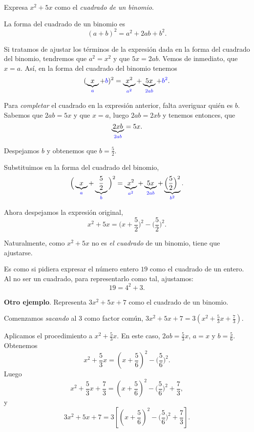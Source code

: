 \documentclass[12pt,letterpaper]{article}
\author{\textsc{Manuel López Mateos}}
\makeatletter
\let\elautor\@author
\newcommand{\nin}{\noindent}
\makeatother
\begin{document}
%
\bigskip 
\nin {\sffamily\scshape\color{orange}Completar Cuadrado}

\nin Expresa $x^2+5x$ como el \emph{cuadrado de un binomio}.

La forma del cuadrado de un binomio es
$$(a+b)^2=a^2+2ab+b^2.$$

Si tratamos de ajustar los términos de la expresión dada en la forma del cuadrado del binomio, tendremos que $a^2=x^2$ y que $5x=2ab$. Vemos de inmediato, que $x=a$. Así, en la forma del cuadrado del binomio tenemos
$$(\underbrace{x}_{\color{blue}a}+{\color{blue}b})^2=\underbrace{x^2}_{\color{blue}a^2}+\underbrace{5x}_{\color{blue}2ab}+{\color{blue}b^2}.$$

Para \emph{completar} el cuadrado en la expresión anterior, falta averiguar quién es $b$. Sabemos que $2ab = 5x$ y que $x=a$, luego $2ab=2xb$ y tenemos entonces, que
$$\underbrace{2xb}_{\color{blue}2ab}=5x.$$

Despejamos $b$ y obtenemos que $b=\frac{5}{2}$.
\smallskip

Substituimos en la forma del cuadrado del binomio,
$$\Big(\underbrace{x}_{\color{blue}a}+\underbrace{\dfrac{5}{2}}_{\color{blue}b}\Big)^2=\underbrace{x^2}_{\color{blue}a^2}+\underbrace{5x}_{\color{blue}2ab}+\underbrace{\Big(\frac{5}{2}\Big)^2}_{\color{blue}b^2}.$$

Ahora despejamos la expresión original,
$$x^2+5x=\Big({x}+\frac{5}{2}\Big)^2-\Big(\frac{5}{2}\Big)^2.$$

Naturalmente, como $x^2 +5x$ no es \emph{el cuadrado} de un binomio, tiene que ajustarse.

Es como si pidiera expresar el número entero $19$ como el cuadrado de un entero. Al no ser un cuadrado, para representarlo como tal, ajustamos:
$$19=4^2+3.$$

\nin\textbf{Otro ejemplo}. Representa \textsc{$3x^2+5x+7$} como el cuadrado de un binomio.

Comenzamos \emph{sacando} al $3$ como factor común, $3x^2+5x+7= 3(x^2+\frac{5}{3}x+\frac{7}{3})$.

Aplicamos el procedimiento a $x^2+\frac{5}{3}x$. En este caso, $2ab=\frac{5}{3}x$, $a=x$ y $b=\frac{5}{6}$. Obtenemos
$$x^2+\frac{5}{3}x={\left(x+\frac{5}{6}\right)}^2-\Big(\frac{5}{6}\Big)^2.$$
Luego
$$x^2+\frac{5}{3}x+\frac{7}{3}={\left(x+\frac{5}{6}\right)}^2-\Big(\frac{5}{6}\Big)^2+\frac{7}{3},$$
y
$$3x^2+5x+7=3\left[{\left(x+\frac{5}{6}\right)}^2-\Big(\frac{5}{6}\Big)^2+\frac{7}{3}\right].$$
\end{document}

